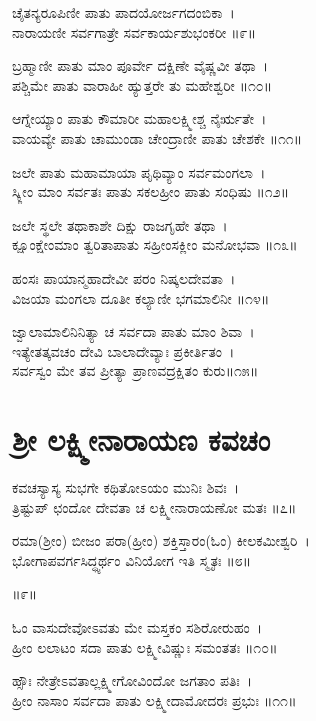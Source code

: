 ಚೈತನ್ಯರೂಪಿಣೀ ಪಾತು ಪಾದಯೋರ್ಜಗದಂಬಿಕಾ~।\\
ನಾರಾಯಣೀ ಸರ್ವಗಾತ್ರೇ ಸರ್ವಕಾರ್ಯಶುಭಂಕರೀ ॥೯॥

ಬ್ರಹ್ಮಾಣೀ ಪಾತು ಮಾಂ ಪೂರ್ವೇ ದಕ್ಷಿಣೇ ವೈಷ್ಣವೀ ತಥಾ~।\\
ಪಶ್ಚಿಮೇ ಪಾತು ವಾರಾಹೀ ಹ್ಯುತ್ತರೇ ತು ಮಹೇಶ್ವರೀ ॥೧೦॥

ಆಗ್ನೇಯ್ಯಾಂ ಪಾತು ಕೌಮಾರೀ ಮಹಾಲಕ್ಷ್ಮೀಶ್ಚ ನೈರ್ಋತೇ~।\\
ವಾಯವ್ಯೇ ಪಾತು ಚಾಮುಂಡಾ ಚೇಂದ್ರಾಣೀ ಪಾತು ಚೇಶಕೇ ॥೧೧॥

ಜಲೇ ಪಾತು ಮಹಾಮಾಯಾ ಪೃಥಿವ್ಯಾಂ ಸರ್ವಮಂಗಲಾ~।\\
ಸ್ಕ್ಲೀಂ ಮಾಂ ಸರ್ವತಃ ಪಾತು ಸಕಲಹ್ರೀಂ ಪಾತು ಸಂಧಿಷು ॥೧೨॥

ಜಲೇ ಸ್ಥಲೇ ತಥಾಕಾಶೇ ದಿಕ್ಷು ರಾಜಗೃಹೇ ತಥಾ~।\\
ಕ್ಷೂಂಕ್ಷೇಂಮಾಂ ತ್ವರಿತಾಪಾತು ಸಹ್ರೀಂಸಕ್ಲೀಂ ಮನೋಭವಾ ॥೧೩॥

ಹಂಸಃ ಪಾಯಾನ್ಮಹಾದೇವೀ ಪರಂ ನಿಷ್ಕಲದೇವತಾ~।\\
ವಿಜಯಾ ಮಂಗಲಾ ದೂತೀ ಕಲ್ಯಾಣೀ ಭಗಮಾಲಿನೀ ॥೧೪॥

ಜ್ವಾಲಾಮಾಲಿನಿನಿತ್ಯಾ ಚ ಸರ್ವದಾ ಪಾತು ಮಾಂ ಶಿವಾ~।\\
ಇತ್ಯೇತತ್ಕವಚಂ ದೇವಿ ಬಾಲಾದೇವ್ಯಾಃ ಪ್ರಕೀರ್ತಿತಂ~।\\
ಸರ್ವಸ್ವಂ ಮೇ ತವ ಪ್ರೀತ್ಯಾ ಪ್ರಾಣವದ್ರಕ್ಷಿತಂ ಕುರು॥೧೫॥

\section{ಶ್ರೀ ಲಕ್ಷ್ಮೀನಾರಾಯಣ ಕವಚಂ }
ಕವಚಸ್ಯಾಸ್ಯ ಸುಭಗೇ ಕಥಿತೋಽಯಂ ಮುನಿಃ ಶಿವಃ~।\\
ತ್ರಿಷ್ಟುಪ್ ಛಂದೋ ದೇವತಾ ಚ ಲಕ್ಷ್ಮೀನಾರಾಯಣೋ ಮತಃ ॥೭॥

ರಮಾ(ಶ್ರೀಂ) ಬೀಜಂ ಪರಾ(ಹ್ರೀಂ) ಶಕ್ತಿಸ್ತಾರಂ(ಓಂ) ಕೀಲಕಮೀಶ್ವರಿ~।\\
ಭೋಗಾಪವರ್ಗಸಿದ್ಧ್ಯರ್ಥಂ ವಿನಿಯೋಗ ಇತಿ ಸ್ಮೃತಃ ॥೮॥

॥೯॥

ಓಂ ವಾಸುದೇವೋಽವತು ಮೇ ಮಸ್ತಕಂ ಸಶಿರೋರುಹಂ~।\\
ಹ್ರೀಂ ಲಲಾಟಂ ಸದಾ ಪಾತು ಲಕ್ಷ್ಮೀವಿಷ್ಣುಃ ಸಮಂತತಃ ॥೧೦॥

ಹ್ಸೌಃ ನೇತ್ರೇಽವತಾಲ್ಲಕ್ಷ್ಮೀಗೋವಿಂದೋ ಜಗತಾಂ ಪತಿಃ~।\\
ಹ್ರೀಂ ನಾಸಾಂ ಸರ್ವದಾ ಪಾತು ಲಕ್ಷ್ಮೀದಾಮೋದರಃ ಪ್ರಭುಃ ॥೧೧॥

